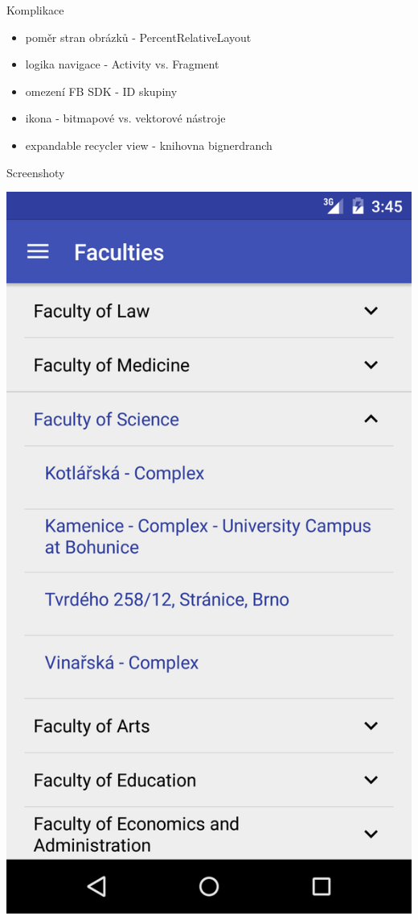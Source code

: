 \documentclass[pdf]{beamer}
\begin{document}
\begin{frame}{Komplikace}
 \begin{itemize}
   \item poměr stran obrázků - PercentRelativeLayout
   \item logika navigace - Activity vs. Fragment
   \item omezení FB SDK - ID skupiny
   \item ikona - bitmapové vs. vektorové nástroje
   \item expandable recycler view - knihovna bignerdranch
 \end{itemize}
\end{frame}

\begin{frame}{Screenshoty}
  \begin{center}
    \includegraphics[scale=0.1]{app-list}

\end{center}
\end{frame}
\end{document}
